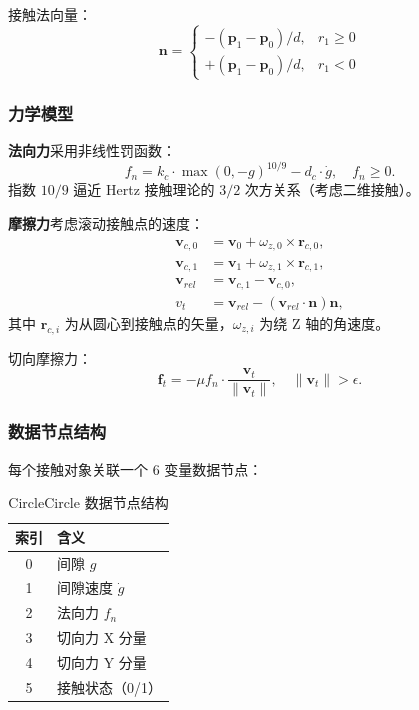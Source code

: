 \documentclass[12pt]{ctexart}
\begin{document}
接触法向量：
\begin{equation}
\mathbf{n} = \begin{cases}
-(\mathbf{p}_1 - \mathbf{p}_0) / d, & r_1 \geq 0 \\ +(\mathbf{p}_1 - \mathbf{p}_0) / d, & r_1 < 0
\end{cases}
\end{equation}

\subsubsection{力学模型}

\textbf{法向力}采用非线性罚函数：
\begin{equation}
f_n = k_c \cdot \max(0, -g)^{10/9} - d_c \cdot \dot{g}, \quad f_n \geq 0.
\end{equation}
指数 $10/9$ 逼近 Hertz 接触理论的 $3/2$ 次方关系（考虑二维接触）。

\textbf{摩擦力}考虑滚动接触点的速度：
\begin{align}
\mathbf{v}_{c,0} &= \mathbf{v}_0 + \omega_{z,0} \times \mathbf{r}_{c,0}, \\ 
\mathbf{v}_{c,1} &= \mathbf{v}_1 + \omega_{z,1} \times \mathbf{r}_{c,1}, \\ 
\mathbf{v}_{rel} &= \mathbf{v}_{c,1} - \mathbf{v}_{c,0}, \\ v_t &= \mathbf{v}_{rel} - (\mathbf{v}_{rel} \cdot \mathbf{n})\mathbf{n},
\end{align}
其中 $\mathbf{r}_{c,i}$ 为从圆心到接触点的矢量，$\omega_{z,i}$ 为绕 Z 轴的角速度。

切向摩擦力：
\begin{equation}
\mathbf{f}_t = -\mu f_n \cdot \frac{\mathbf{v}_t}{\|\mathbf{v}_t\|}, \quad \|\mathbf{v}_t\| > \epsilon.
\end{equation}

\subsubsection{数据节点结构}

每个接触对象关联一个 6 变量数据节点：
\begin{table}[htbp]
\centering
\small
\begin{tabular}{cl}
\toprule
索引 & 含义 \\
\midrule
0 & 间隙 $g$ \\
1 & 间隙速度 $\dot{g}$ \\
2 & 法向力 $f_n$ \\
3 & 切向力 X 分量 \\
4 & 切向力 Y 分量 \\
5 & 接触状态（0/1） \\
\bottomrule
\end{tabular}
\caption{CircleCircle 数据节点结构}
\end{table}
\end{document}
